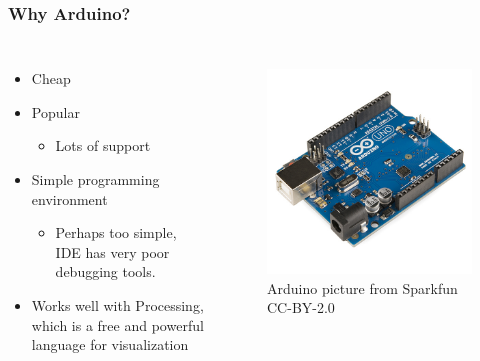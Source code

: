 \documentclass{beamer}
\begin{document}
\begin{frame}
\frametitle{Why Arduino?}
\begin{columns}[t]
\begin{itemize}
\item{Cheap}
\item {Popular}
\begin{itemize}
\item {Lots of support}
\end{itemize}
\item {Simple programming environment}
\begin{itemize}
\item {Perhaps too simple, IDE has very poor debugging tools.}
\end{itemize}
\item{Works well with Processing, which is a free and powerful language for visualization}
\end{itemize}
\begin{figure}
\hspace*{-.75cm}\includegraphics[scale=.25]{Arduino_Uno_-_R3.jpg}\\
\tiny {Arduino picture from Sparkfun CC-BY-2.0}
\end{figure}
\end{columns}
\end{frame}
\end{document}
